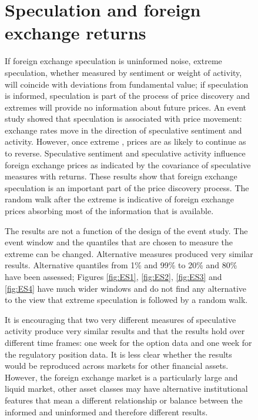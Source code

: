 \documentclass[ijfs,article,submit,oneauthor,pdftex,10pt,a4paper]{mdpi}
\begin{document}
{\begin{figure}
\section{Speculation and foreign exchange returns}
If foreign exchange speculation is uninformed noise, extreme speculation, whether measured by sentiment or weight of activity, will coincide with deviations from fundamental value; if speculation is informed, speculation is part of the process of price discovery and extremes will provide no information about future prices. An event study showed that speculation is associated with price movement: exchange rates move in the direction of speculative sentiment and activity.  However, once extreme , prices are as likely to continue as to reverse. Speculative sentiment and speculative activity influence foreign exchange prices as indicated by the covariance of speculative measures with returns.  These results show that foreign exchange speculation is an important part of the price discovery process.  The random walk after the extreme is indicative of foreign exchange prices absorbing most of the information that is available.  
  
The results are not a function of the design of the event study.  The event window and the quantiles that are chosen to measure the extreme can be changed.  Alternative measures produced very similar results. Alternative quantiles from 1\% and 99\% to 20\% and 80\% have been assessed; Figures \ref{fig:ES1}, \ref{fig:ES2}, \ref{fig:ES3} and \ref{fig:ES4} have much wider windows and do not find any alternative to the view that extreme speculation is followed by a random walk. 

It is encouraging that two very different measures of speculative activity produce very similar results and that the results hold over different time frames: one week for the option data and one week for the regulatory position data.  It is less clear whether the results would be reproduced across markets for other financial assets.    However, the foreign exchange market is a particularly large and liquid market, other asset classes may have alternative institutional features that mean a different relationship or balance between the informed and uninformed and therefore different results.  


\end{figure}}
\end{document}
